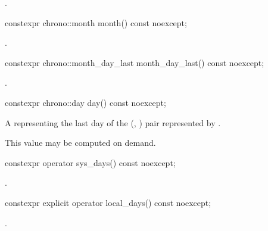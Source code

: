 \begin{itemdescr}
\pnum
\returns
{}.
\end{itemdescr}

%
\begin{itemdecl}
constexpr chrono::month month() const noexcept;
\end{itemdecl}

\begin{itemdescr}
\pnum
\returns
{}.
\end{itemdescr}

%
\begin{itemdecl}
constexpr chrono::month_day_last month_day_last() const noexcept;
\end{itemdecl}

\begin{itemdescr}
\pnum
\returns
{}.
\end{itemdescr}

%
\begin{itemdecl}
constexpr chrono::day day() const noexcept;
\end{itemdecl}

\begin{itemdescr}
\pnum
\returns
A  representing the last day of the (, ) pair
represented by .

\pnum
\begin{note}
This value may be computed on demand.
\end{note}
\end{itemdescr}

%
\begin{itemdecl}
constexpr operator sys_days() const noexcept;
\end{itemdecl}

\begin{itemdescr}
\pnum
\returns
{}.
\end{itemdescr}

%
\begin{itemdecl}
constexpr explicit operator local_days() const noexcept;
\end{itemdecl}

\begin{itemdescr}
\pnum
\returns
{}.
\end{itemdescr}

